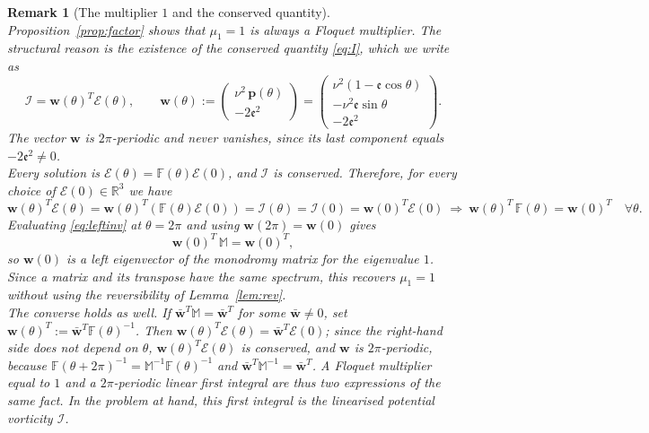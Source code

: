 \documentclass[reqno]{amsart}
\newcommand{\F}{\mathbb{F}}
\newcommand{\ee}{\mathfrak{e}}
\newtheorem{remark}[theorem]{Remark}
\begin{document}
\begin{remark}[The multiplier $1$ and the conserved quantity]\label{rem:mult1}
Proposition~\ref{prop:factor} shows that $\mu_1=1$ is always a Floquet multiplier. The structural reason is the existence of the conserved quantity \eqref{eq:I}, which we write as
\begin{equation}\label{I scalar product}
\mathcal I=\mathbf w(\theta)^T\boldsymbol{\mathcal E}(\theta),\qquad
\mathbf w(\theta):=\begin{pmatrix}\nu^2\,\mathbf p(\theta)\\[2pt] -2\ee^2\end{pmatrix}=\begin{pmatrix}\nu^2(1-\ee\cos\theta)\\-\nu^2\ee\sin\theta\\ -2\ee^2\end{pmatrix}.
\end{equation}
The vector $\mathbf w$ is $2\pi$-periodic and never vanishes, since its last component equals $-2\ee^2\neq0$.\\
\noindent
Every solution is $\boldsymbol{\mathcal E}(\theta)=\F(\theta)\boldsymbol{\mathcal E}(0)$, and $\mathcal I$ is conserved. Therefore, for every choice of $\boldsymbol{\mathcal E}(0)\in\mathbb R^3$ we have
\begin{equation}\label{eq:leftinv}
\mathbf w(\theta)^T\boldsymbol{\mathcal E}(\theta)=\mathbf w(\theta)^T\left(\mathbb{F}(\theta)\boldsymbol{\mathcal E}(0)\right)=\mathcal{I}(\theta)=\mathcal{I}(0)=\mathbf w(0)^T\boldsymbol{\mathcal E}(0)  \  \Rightarrow\ \mathbf w(\theta)^T\,\F(\theta)=\mathbf w(0)^T\quad\forall\theta .
\end{equation}
Evaluating \eqref{eq:leftinv} at $\theta=2\pi$ and using $\mathbf w(2\pi)=\mathbf w(0)$ gives
\begin{equation}\label{eq:lefteig}
\mathbf w(0)^T\,\mathbb M=\mathbf w(0)^T ,
\end{equation}
so $\mathbf w(0)$ is a left eigenvector of the monodromy matrix for the eigenvalue $1$. Since a matrix and its transpose have the same spectrum, this recovers $\mu_1=1$ without using the reversibility of Lemma~\ref{lem:rev}.\\
\noindent
The converse holds as well. If $\mathbf{\bar{w}}^T\mathbb M=\mathbf{\bar{w}}^T$ for some $\mathbf{\bar{w}}\neq0$, set $\mathbf w(\theta)^T:=\mathbf{\bar{w}}^T\F(\theta)^{-1}$. Then $\mathbf w(\theta)^T\boldsymbol{\mathcal E}(\theta)=\mathbf{\bar{w}}^T\boldsymbol{\mathcal E}(0)$; since the right-hand side does not depend on $\theta$, $\mathbf w(\theta)^T\boldsymbol{\mathcal E}(\theta)$ is conserved, and $\mathbf w$ is $2\pi$-periodic, because $\F(\theta+2\pi)^{-1}=\mathbb M^{-1}\F(\theta)^{-1}$ and $\mathbf{\bar{w}}^T\mathbb M^{-1}=\mathbf{\bar{w}}^T$. A Floquet multiplier equal to $1$ and a $2\pi$-periodic linear first integral are thus two expressions of the same fact. In the problem at hand, this first integral is the linearised potential vorticity $\mathcal I$.
\end{remark}
\end{document}
